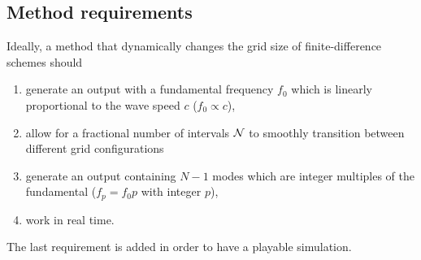 \subsection{Method requirements}\label{sec:methodReq}
Ideally, a method that dynamically changes the grid size of finite-difference schemes should
\begin{enumerate}
    \item generate an output with a fundamental frequency $f_0$ %
    which is linearly proportional to the wave speed $c$ ($f_0 \propto c$),
    \item allow for a fractional number of intervals $\mathcal{N}$ to smoothly transition between different grid configurations%
    \item generate an output containing $ N-1$ modes which are integer multiples of the fundamental ($f_p = f_0 p$ with integer $p$),
    \item work in real time.
\end{enumerate}
The last requirement is added in order to have a playable simulation.
%


